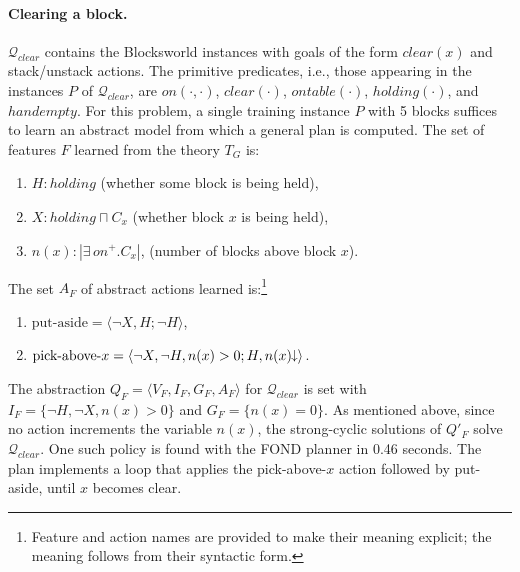 \documentclass[letterpaper]{article} %
\newcommand{\tup}[1]{\langle #1 \rangle}
\newcommand{\abs}[1]{\ensuremath{\left\vert{#1}\right\vert}}
\newcommand{\Q}{\mathcal{Q}}
\newcommand{\abst}[2]{\tup{#1;#2}}
\newcommand{\mminus}{\hspace{-.05em}\raisebox{.15ex}{\footnotesize$\downarrow$}}
\begin{document}
\paragraph{Clearing a block.}
$\Q_{clear}$ contains the Blocksworld instances  with goals of the form  $clear(x)$
and stack/unstack actions. The primitive predicates, i.e., those appearing in the  instances $P$ of $\Q_{clear}$,
are $on(\cdot,\cdot)$, $clear(\cdot)$, $ontable(\cdot)$, $holding(\cdot)$, and $handempty$.
For this problem, a  single training instance $P$  with  5 blocks suffices to learn an abstract
model from  which a general plan is computed. The  set of features $F$ learned from the theory $T_G$ is:
\begin{enumerate}[--]
  \item $H: holding$ (whether some block is being held),
  \item $X: holding \sqcap C_x$ (whether block $x$ is being held),
  \item $n(x): \abs{\exists\,on^+ . C_x}$, (number of blocks above block $x$).
\end{enumerate}

\noindent The set $A_F$  of abstract actions learned is:\footnote{Feature and action
  names are provided to make their meaning explicit; the meaning follows from their syntactic form.}

\begin{enumerate}[--]
  \item $\text{put-aside} = \abst{\neg X, H}{\neg H}$,
  \item $\text{pick-above-$x$} = \abst{\neg X, \neg H, n(x) > 0}{H, n(x)\mminus}$.
\end{enumerate}

The  abstraction $Q_F=\tup{V_F,I_F,G_F,A_F}$ for $\Q_{clear}$ is set with
$I_F = \{\neg H, \neg X, n(x) > 0\}$ and $G_F=\{n(x)=0\}$.
As mentioned above, since no action increments the variable $n(x)$,
the strong-cyclic solutions of $Q'_F$ solve $\Q_{clear}$.
One such policy is found with the FOND planner in 0.46 seconds.
The plan implements a loop that applies the pick-above-$x$
action followed by put-aside, until $x$ becomes clear.


%

%
\end{document}
